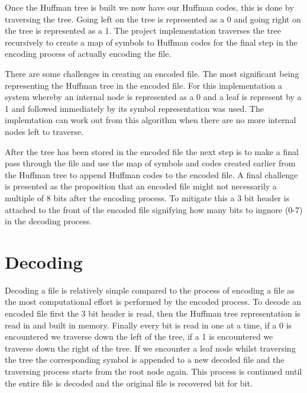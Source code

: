 \doublespacing
\singlespacing
Once the Huffman tree is built we now have our Huffman codes, this is done by traversing the tree. Going left on the tree is represented as a 0 and going right on the tree is represented as a 1. The project implementation traverses the tree recursively to create a map of symbols to Huffman codes for the final step in the encoding process of actually encoding the file.


\doublespacing
\singlespacing
There are some challenges in creating an encoded file. The most significant being representing the Huffman tree in the encoded file. For this implementation a system whereby an internal node is represented as a 0 and a leaf is represent by a 1 and followed immediately by its symbol representation was used. The implemtation can work out from this algorithm when there are no more internal nodes left to traverse.


\doublespacing
\singlespacing
After the tree has been stored in the encoded file the next step is to make a final pass through the file and use the map of symbols and codes created earlier from the Huffman tree to append Huffman codes to the encoded file. A final challenge is presented as the proposition that an encoded file might not necessarily a multiple of 8 bits after the encoding process. To mitigate this a 3 bit header is attached to the front of the encoded file signifying how many bits to ingnore (0-7) in the decoding process.


\doublespacing
\singlespacing
\section{Decoding}


Decoding a file is relatively simple compared to the process of encoding a file as the most computational effort is performed by the encoded process. To decode an encoded file first the 3 bit header is read, then the Huffman tree representation is read in and built in memory. Finally every bit is read in one at a time, if a 0 is encountered we traverse down the left of the tree, if a 1 is encountered we traverse down the right of the tree. If we encounter a leaf node whilst traversing the tree the corresponding symbol is appended to a new decoded file and the traversing process starts from the root node again. This process is continued until the entire file is decoded and the original file is recovered bit for bit.
